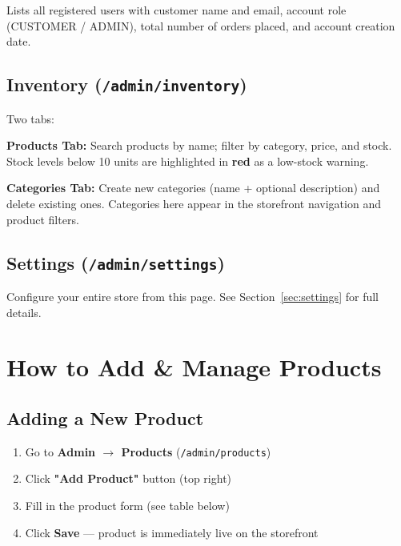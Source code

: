 \documentclass[12pt,a4paper]{article}
\begin{document}
Lists all registered users with customer name and email, account role (CUSTOMER / ADMIN), total number of orders placed, and account creation date.

\subsection{Inventory (\texttt{/admin/inventory})}

Two tabs:

\textbf{Products Tab:} Search products by name; filter by category, price, and stock. Stock levels below 10 units are highlighted in \textcolor{dangerred}{\textbf{red}} as a low-stock warning.

\textbf{Categories Tab:} Create new categories (name + optional description) and delete existing ones. Categories here appear in the storefront navigation and product filters.

\subsection{Settings (\texttt{/admin/settings})}

Configure your entire store from this page. See Section~\ref{sec:settings} for full details.

\section{How to Add \& Manage Products}

\subsection{Adding a New Product}

\begin{enumerate}[leftmargin=2em, itemsep=4pt]
  \item Go to \textbf{Admin $\rightarrow$ Products} (\texttt{/admin/products})
  \item Click \textbf{"Add Product"} button (top right)
  \item Fill in the product form (see table below)
  \item Click \textbf{Save} — product is immediately live on the storefront
\end{enumerate}
\end{document}
